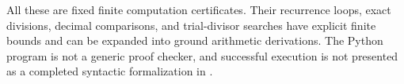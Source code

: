 All these are fixed finite computation certificates. Their recurrence loops,
exact divisions, decimal comparisons, and trial-divisor searches have explicit
finite bounds and can be expanded into ground arithmetic derivations. The
Python program is not a generic proof checker, and successful execution is
not presented as a completed syntactic formalization in \ipra.

